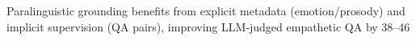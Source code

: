 \documentclass{article}
\begin{document}
Paralinguistic grounding benefits from explicit metadata (emotion/prosody) and implicit supervision (QA pairs), improving LLM‑judged empathetic QA by 38–46%
\end{document}
